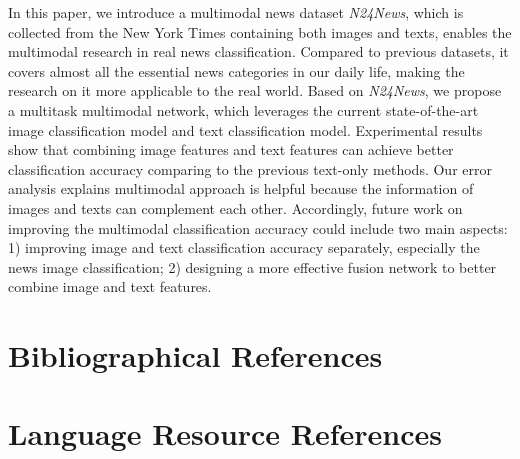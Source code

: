 \documentclass[10pt, a4paper]{article}
\begin{document}
In this paper, we introduce a multimodal news dataset \textit{N24News}, which is collected from the New York Times containing both images and texts, enables the multimodal research in real news classification. Compared to previous datasets, it covers almost all the essential news categories in our daily life, 
making the research on it more applicable to the real world. 
Based on \textit{N24News}, we propose a multitask multimodal network, which leverages the current state-of-the-art image classification model and text classification model. Experimental results show that combining image features and text features can achieve better classification accuracy comparing to the previous text-only methods. Our error analysis explains multimodal approach is helpful because the information of images and texts can complement each other. Accordingly, future work on improving the multimodal classification accuracy could include two main aspects: 1) improving image and text classification accuracy separately, especially the news image classification; 2) designing a more effective fusion network to better combine image and text features. 

\section{Bibliographical References}\label{reference}





\section{Language Resource References}
\label{lr:ref}
\end{document}
